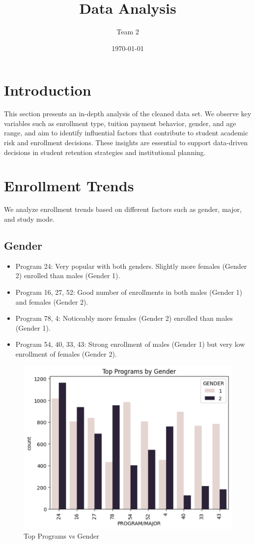\documentclass[12pt]{article}
\title{Data Analysis}
\author{Team 2}
\date{\today}
\begin{document}
\maketitle

\section{Introduction}
This section presents an in-depth analysis of the cleaned data set. We observe key variables such as enrollment type, tuition payment behavior, gender, and age range, and aim to identify influential factors that contribute to student academic risk and enrollment decisions. These insights are essential to support data-driven decisions in student retention strategies and institutional planning.


\section{Enrollment Trends}
We analyze enrollment trends based on different factors such as gender, major, and study mode.

\subsection{Gender}
\begin{itemize}
    \item Program 24: Very popular with both genders. Slightly more females (Gender 2) enrolled than males (Gender 1).

    \item Program 16, 27, 52: Good number of enrollments in both males (Gender 1) and females (Gender 2).

    \item Program 78, 4: Noticeably more females (Gender 2) enrolled than males (Gender 1).

    \item Program 54, 40, 33, 43: Strong enrollment of males (Gender 1) but very low enrollment of females (Gender 2).
\end{itemize}

\begin{figure}[H]
    \centering
    \includegraphics[width=0.7\linewidth]{top_programs_gender.png}
    \caption{Top Programs vs Gender}
\end{figure}
\end{document}
